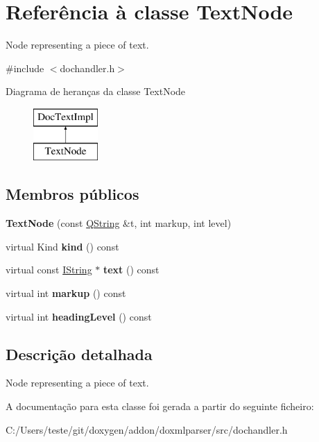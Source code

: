 \hypertarget{class_text_node}{\section{Referência à classe Text\-Node}
\label{class_text_node}
}


Node representing a piece of text.  




{\ttfamily \#include $<$dochandler.\-h$>$}

Diagrama de heranças da classe Text\-Node\begin{figure}[H]
\begin{center}
\leavevmode
\includegraphics[height=2.000000cm]{class_text_node}
\end{center}
\end{figure}
\subsection*{Membros públicos}
\begin{DoxyCompactItemize}
\item 
\hypertarget{class_text_node_aadbd06c578c841b62bc63365f6e4500a}{{\bfseries Text\-Node} (const \hyperlink{class_q_string}{Q\-String} \&t, int markup, int level)}\label{class_text_node_aadbd06c578c841b62bc63365f6e4500a}

\item 
\hypertarget{class_text_node_af8e62c8a81ddf2283205cc8955de50eb}{virtual Kind {\bfseries kind} () const }\label{class_text_node_af8e62c8a81ddf2283205cc8955de50eb}

\item 
\hypertarget{class_text_node_a38ed11cab67ca9bf8d04302e53b86a69}{virtual const \hyperlink{class_i_string}{I\-String} $\ast$ {\bfseries text} () const }\label{class_text_node_a38ed11cab67ca9bf8d04302e53b86a69}

\item 
\hypertarget{class_text_node_a078c178bc3d5ae1b49603c380f6ab0b9}{virtual int {\bfseries markup} () const }\label{class_text_node_a078c178bc3d5ae1b49603c380f6ab0b9}

\item 
\hypertarget{class_text_node_a5b2ef967a93a14add13c4debc0641feb}{virtual int {\bfseries heading\-Level} () const }\label{class_text_node_a5b2ef967a93a14add13c4debc0641feb}

\end{DoxyCompactItemize}


\subsection{Descrição detalhada}
Node representing a piece of text. 



A documentação para esta classe foi gerada a partir do seguinte ficheiro\-:\begin{DoxyCompactItemize}
\item 
C\-:/\-Users/teste/git/doxygen/addon/doxmlparser/src/dochandler.\-h\end{DoxyCompactItemize}
